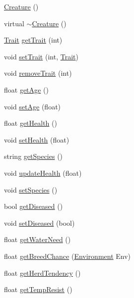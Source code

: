 \begin{DoxyCompactItemize}
\item 
\hyperlink{class_creature_a597cc3b08ee17de46c3e7ec3cf0d9b58}{Creature} ()
\item 
virtual \hyperlink{class_creature_aa991b23f4813fbdb6f875204ed49814d}{$\sim$\+Creature} ()
\item 
\hyperlink{class_trait}{Trait} \hyperlink{class_creature_a5cbb05e4ed97cefab203ce1d0a639663}{get\+Trait} (int)
\item 
void \hyperlink{class_creature_a5e9314c792471d371c9255567c7f57f6}{set\+Trait} (int, \hyperlink{class_trait}{Trait})
\item 
void \hyperlink{class_creature_a68390ce1e3db845b569edbb56d2a2e45}{remove\+Trait} (int)
\item 
float \hyperlink{class_creature_aaa5ecf02e6ec776831d68ee031c3a71a}{get\+Age} ()
\item 
void \hyperlink{class_creature_a53a6ce1c089f66f5d72d383918ac6c56}{set\+Age} (float)
\item 
float \hyperlink{class_creature_afbda0cd7841915f1fb1f0b00002e4d9a}{get\+Health} ()
\item 
void \hyperlink{class_creature_a470452d2a72844d841475e2fa1411b87}{set\+Health} (float)
\item 
string \hyperlink{class_creature_a29c472b8d8c500ed750028d35008b874}{get\+Species} ()
\item 
void \hyperlink{class_creature_abe278d213726a2385c03348e0b70baaf}{update\+Health} (float)
\item 
void \hyperlink{class_creature_ad55d859cd054fb78c7ec368a8f93fdab}{set\+Species} ()
\item 
bool \hyperlink{class_creature_a9758254f86daca23432c2aa52388b371}{get\+Diseased} ()
\item 
void \hyperlink{class_creature_a87418faed3520d70b5e79454c51d9d6b}{set\+Diseased} (bool)
\item 
float \hyperlink{class_creature_afc61264e8b9d6e683aa73e225d9165ec}{get\+Water\+Need} ()
\item 
float \hyperlink{class_creature_afaa5a16d665af1b106ea974314ed000b}{get\+Breed\+Chance} (\hyperlink{class_environment}{Environment} Env)
\item 
float \hyperlink{class_creature_a1683c23a3644294d16529feb3d10e2c3}{get\+Herd\+Tendency} ()
\item 
float \hyperlink{class_creature_af2d9ed47b9f8c4baebf8be7f1a6c7c16}{get\+Temp\+Resist} ()
\item 

\end{DoxyCompactItemize}

